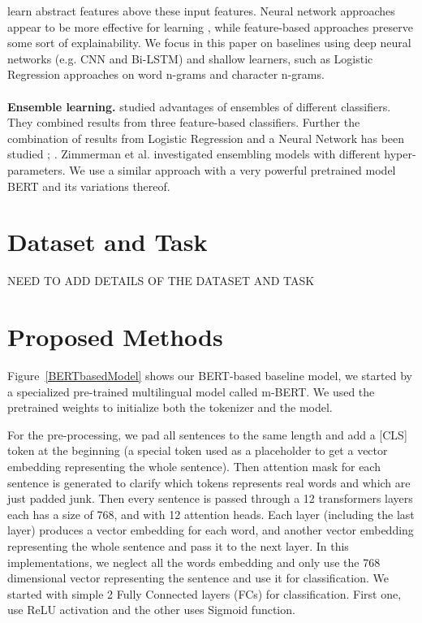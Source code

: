\documentclass[10pt,twocolumn,letterpaper]{article}
\begin{document}
learn abstract features above these input features. Neural network approaches appear to be more effective for learning \cite{r06}, while
feature-based approaches preserve some sort of
explainability. We focus in this paper on baselines using deep neural networks (e.g. CNN and
Bi-LSTM) and shallow learners, such as Logistic
Regression approaches on word n-grams and character n-grams.\\\\
\textbf{Ensemble learning.} \cite{r06} studied advantages of ensembles of different classifiers. They combined results from three
feature-based classifiers. Further the combination
of results from Logistic Regression and a Neural Network has been studied \cite{r34}; \cite{r35}. Zimmerman
et al. \cite{r36} investigated ensembling models with
different hyper-parameters. We use a similar approach with a very powerful pretrained model BERT and its variations thereof.

\section{Dataset and Task}

NEED TO ADD DETAILS OF THE DATASET AND TASK

\section{Proposed Methods}
Figure~\ref{BERTbasedModel} shows our BERT-based\cite{devlin2018bert} baseline model, we started by a specialized pre-trained multilingual model called m-BERT. We used the pretrained weights to initialize both the tokenizer and the model.

For the pre-processing, we pad all sentences to the same length and add a [CLS] token at the beginning (a special token used as a placeholder to get a vector embedding representing the whole sentence). Then attention mask for each sentence is generated to clarify which tokens represents real words and which are just padded junk. Then every sentence is passed through a 12 transformers layers each has a size of 768, and with 12 attention heads. Each layer (including the last layer) produces a vector embedding for each word, and another vector embedding representing the whole sentence and pass it to the next layer. In this implementations, we neglect all the words embedding and only use the 768 dimensional vector representing the sentence and use it for classification. We started with simple 2 Fully Connected layers (FCs) for classification. First one, use ReLU activation and the other uses Sigmoid function. 
\end{document}
